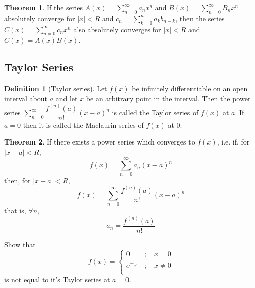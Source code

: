 \documentclass[fleqn, a4paper, 12pt, twoside]{article}
\theoremstyle{definition}
\newtheorem{definition}{Definition}
\theoremstyle{theorem}
\newtheorem{theorem}{Theorem}
\begin{document}
{\begin{theorem}
	If the series $A(x) = \sum\limits_{n = 0}^{\infty} a_n x^n$ and $B(x) = \sum\limits_{n = 0}^{\infty} B_n x^n$ absolutely converge for $|x| < R$ and $c_n = \sum\limits_{k = 0}^{n} a_k b_{n - k}$, then the series $C(x) = \sum\limits_{n = 0}^{\infty} c_n x^n$ also absolutely converges for $|x| < R$ and $C(x) = A(x) B(x)$.
\end{theorem}

\subsection{Taylor Series}

\begin{definition}[Taylor series]
	Let $f(x)$ be infinitely differentiable on an open interval about $a$ and let $x$ be an arbitrary point in the interval.
	Then the power series $\sum\limits_{n = 0}^{\infty} \dfrac{f^{(n)}(a)}{n!} (x - a)^n$ is called the Taylor series of $f(x)$ at $a$.
	If $a = 0$ then it is called the Maclaurin series of $f(x)$ at $0$.
\end{definition}

\begin{theorem}
	If there exists a power series which converges to $f(x)$, i.e. if, for $|x - a| < R$,
	\begin{equation*}
		f(x) = \sum\limits_{n = 0}^{\infty} a_n (x - a)^n
	\end{equation*}
	then, for $|x - a| < R$,
	\begin{equation*}
		f(x) = \sum\limits_{n = 0}^{\infty} \dfrac{f^{(n)}(a)}{n!} (x - a)^n
	\end{equation*}
	that is, $\forall n$,
	\begin{equation*}
		a_n = \dfrac{f^{(n)}(a)}{n!}
	\end{equation*}
\end{theorem}

\begin{question}
	Show that
	\begin{equation*}
		f(x) = 
		\begin{cases}
			0 &;\quad x = 0\\
			e^{-\frac{1}{x^2}} &;\quad x \neq 0\\
		\end{cases}
	\end{equation*}
	is not equal to it's Taylor series at $a = 0$.
\end{question}

}
\end{document}
